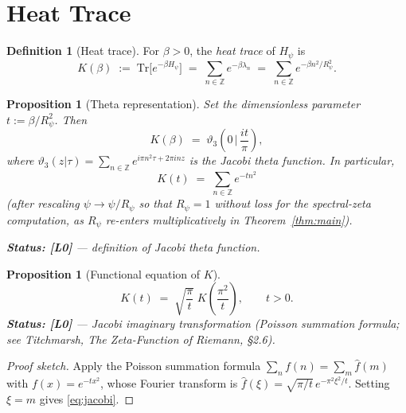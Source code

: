 \documentclass[11pt,a4paper]{article}
\newtheorem{proposition}[theorem]{Proposition}
\theoremstyle{definition}
\newtheorem{definition}[theorem]{Definition}
\theoremstyle{remark}
\newcommand{\Rp}{R_{\psi}}
\newcommand{\Hp}{H_{\psi}}
\begin{document}
\section{Heat Trace}
\label{sec:heat}

\begin{definition}[Heat trace]\label{def:heat}
For $\beta > 0$, the \emph{heat trace} of $\Hp$ is
\begin{equation}\label{eq:heat-def}
  K(\beta) \;:=\; \mathrm{Tr}\bigl[e^{-\beta \Hp}\bigr]
            \;=\; \sum_{n\in\mathbb{Z}} e^{-\beta\lambda_n}
            \;=\; \sum_{n\in\mathbb{Z}} e^{-\beta n^2/\Rp^2}.
\end{equation}
\end{definition}

\begin{proposition}[Theta representation]\label{prop:theta}
Set the dimensionless parameter $t := \beta/\Rp^2$.  Then
\begin{equation}\label{eq:theta}
  K(\beta) \;=\; \vartheta_3\!\left(0\,\Big|\,\frac{it}{\pi}\right),
\end{equation}
where $\vartheta_3(z|\tau) = \sum_{n\in\mathbb{Z}} e^{i\pi n^2\tau + 2\pi i n z}$
is the Jacobi theta function.  In particular,
\begin{equation}\label{eq:theta-plain}
  K(t) \;=\; \sum_{n\in\mathbb{Z}} e^{-t n^2}
\end{equation}
(after rescaling $\psi \to \psi/\Rp$ so that $\Rp=1$
without loss for the spectral-zeta computation, as $\Rp$ re-enters
multiplicatively in Theorem~\ref{thm:main}).

\textbf{Status: [L0]} — definition of Jacobi theta function.
\end{proposition}

\begin{proposition}[Functional equation of $K$]\label{prop:jacobi}
\begin{equation}\label{eq:jacobi}
  K(t) \;=\; \sqrt{\frac{\pi}{t}}\; K\!\left(\frac{\pi^2}{t}\right),
  \qquad t > 0.
\end{equation}
\textbf{Status: [L0]} — Jacobi imaginary transformation (Poisson summation
formula; see Titchmarsh, \emph{The Zeta-Function of Riemann}, §2.6).
\end{proposition}

\begin{proof}[Proof sketch]
Apply the Poisson summation formula $\sum_n f(n) = \sum_m \hat f(m)$
with $f(x) = e^{-tx^2}$, whose Fourier transform is
$\hat f(\xi) = \sqrt{\pi/t}\,e^{-\pi^2\xi^2/t}$.
Setting $\xi = m$ gives \eqref{eq:jacobi}.
\end{proof}
\end{document}
